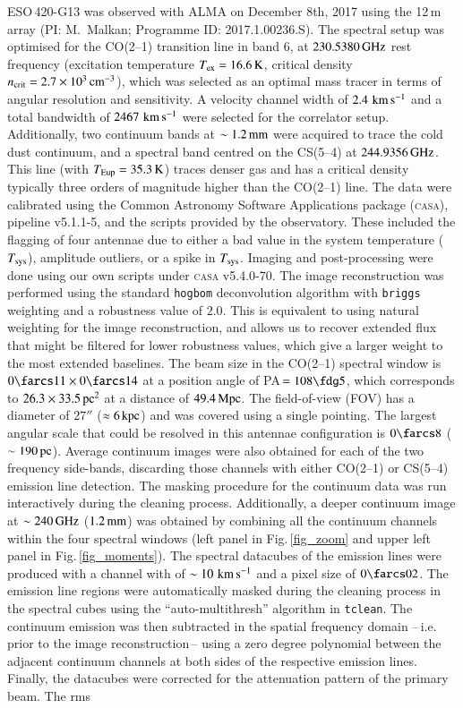 \documentclass[longauth]{aa}
\newcommand{\kms}{\,\hbox{\hbox{km}\,\hbox{s}$^{-1}$}}
\begin{document}
ESO\,420-G13 was observed with ALMA on December 8th, 2017 using the 12\,m array (PI: \mbox{M. Malkan}; Programme ID: 2017.1.00236.S). The spectral setup was optimised for the CO(2--1) transition line in band 6, at $230.5380\, \rm{GHz}$ rest frequency (excitation temperature $T_{\rm ex} = 16.6\, \rm{K}$, critical density $n_{\rm crit} = 2.7 \times 10^3\, \rm{cm^{-3}}$), which was selected as an optimal mass tracer in terms of angular resolution and sensitivity. A velocity channel width of $2.4\, \rm{\kms}$ and a total bandwidth of $2467\, \rm{\kms}$ were selected for the correlator setup. Additionally, two continuum bands at $\sim 1.2\, \rm{mm}$ were acquired to trace the cold dust continuum, and a spectral band centred on the CS(5--4) at $244.9356\, \rm{GHz}$. This line (with $T_{\rm Eup} = 35.3\, \rm{K}$) traces denser gas and has a critical density typically three orders of magnitude higher than the CO(2--1) line. The data were calibrated using the Common Astronomy Software Applications package (\textsc{casa}), pipeline v5.1.1-5, and the scripts provided by the observatory. These included the flagging of four antennae due to either a bad value in the system temperature ($T_{\rm sys}$), amplitude outliers, or a spike in $T_{\rm sys}$. Imaging and post-processing were done using our own scripts under \textsc{casa} v5.4.0-70. The image reconstruction was performed using the standard \texttt{hogbom} deconvolution algorithm with \texttt{briggs} weighting and a robustness value of $2.0$. This is equivalent to using natural weighting for the image reconstruction, and allows us to recover extended flux that might be filtered for lower robustness values, which give a larger weight to the most extended baselines. The beam size in the CO(2--1) spectral window is $0\farcs11 \times 0\farcs14$ at a position angle of PA\,$= 108\fdg5$, which corresponds to $26.3 \times 33.5\, \rm{pc^2}$ at a distance of $49.4\, \rm{Mpc}$. The field-of-view (FOV) has a diameter of $27''$ ($\approx 6\, \rm{kpc}$) and was covered using a single pointing. The largest angular scale that could be resolved in this antennae configuration is $0\farcs8$ ($\sim 190\, \rm{pc}$). Average continuum images were also obtained for each of the two frequency side-bands, discarding those channels with either CO(2--1) or CS(5--4) emission line detection. The masking procedure for the continuum data was run interactively during the cleaning process. Additionally, a deeper continuum image at $\sim 240\, \rm{GHz}$ ($1.2 \, \rm{mm}$) was obtained by combining all the continuum channels within the four spectral windows (left panel in Fig.\,\ref{fig_zoom} and upper left panel in Fig.\,\ref{fig_moments}). The spectral datacubes of the emission lines were produced with a channel with of $\sim 10\, \rm{\kms}$ and a pixel size of $0\farcs02$. The emission line regions were automatically masked during the cleaning process in the spectral cubes using the ``auto-multithresh'' algorithm in \texttt{tclean}. The continuum emission was then subtracted in the spatial frequency domain --\,i.e. prior to the image reconstruction\,-- using a zero degree polynomial between the adjacent continuum channels at both sides of the respective emission lines. Finally, the datacubes were corrected for the attenuation pattern of the primary beam. The rms 
\end{document}

